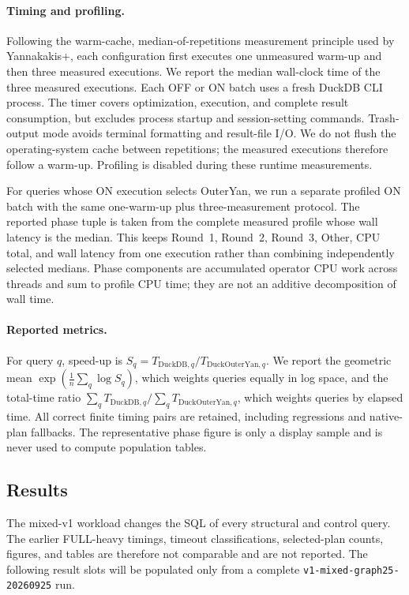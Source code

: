 \paragraph{Timing and profiling.}
Following the warm-cache, median-of-repetitions measurement principle used by
Yannakakis+, each configuration first executes one unmeasured warm-up and then
three measured executions. We report the median wall-clock time of the three
measured executions. Each OFF or ON batch uses a fresh DuckDB CLI process.
The timer covers optimization, execution, and complete result consumption, but
excludes process startup and session-setting commands. Trash-output mode avoids
terminal formatting and result-file I/O. We do not flush the operating-system
cache between repetitions; the measured executions therefore follow a warm-up.
Profiling is disabled during these runtime measurements.

For queries whose ON execution selects OuterYan, we run a separate profiled ON
batch with the same one-warm-up plus three-measurement protocol. The reported
phase tuple is taken from the complete measured profile whose wall latency is
the median. This keeps Round~1, Round~2, Round~3, Other, CPU total, and wall
latency from one execution rather than combining independently selected
medians. Phase components are accumulated operator CPU work across threads and
sum to profile CPU time; they are not an additive decomposition of wall time.

\paragraph{Reported metrics.}
For query $q$, speed-up is
$S_q=T_{\mathrm{DuckDB},q}/T_{\mathrm{DuckOuterYan},q}$.
We report the geometric mean
$\exp\!\left(\frac{1}{n}\sum_q \log S_q\right)$, which weights queries equally
in log space, and the total-time ratio
$\sum_q T_{\mathrm{DuckDB},q}/\sum_q T_{\mathrm{DuckOuterYan},q}$, which weights
queries by elapsed time. All correct finite timing pairs are retained,
including regressions and native-plan fallbacks. The representative phase
figure is only a display sample and is never used to compute population tables.

\subsection{Results}
\label{sec:experimental-results}

The mixed-v1 workload changes the SQL of every structural and control query.
The earlier FULL-heavy timings, timeout classifications, selected-plan counts,
figures, and tables are therefore not comparable and are not reported. The
following result slots will be populated only from a complete
\texttt{v1-mixed-graph25-20260925} run.

